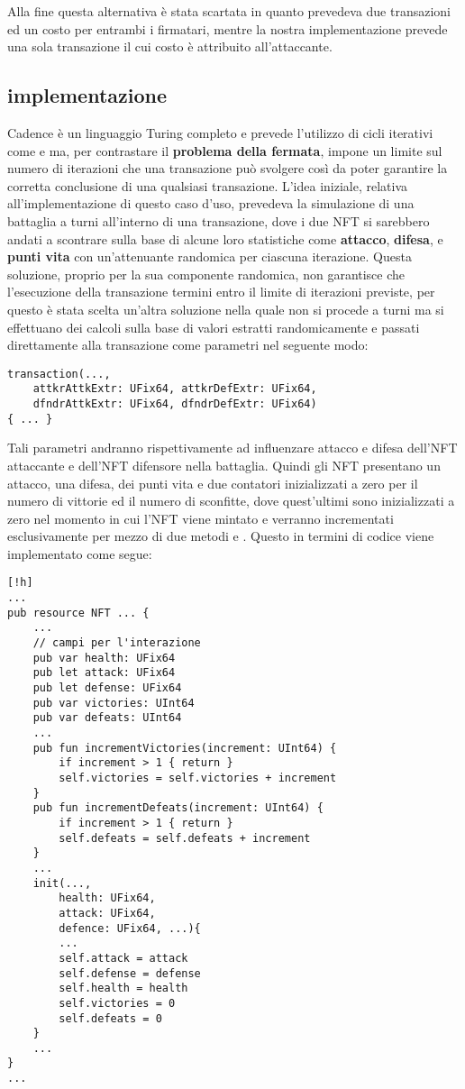 Alla fine questa alternativa è stata scartata in quanto prevedeva due transazioni ed un costo per entrambi i firmatari, mentre la nostra implementazione prevede una sola transazione il cui costo è attribuito all'attaccante.

\subsection{implementazione}
Cadence è un linguaggio Turing completo e prevede l'utilizzo di cicli iterativi come  e  ma, per contrastare il \textbf{problema della fermata}, impone un limite sul numero di iterazioni che una transazione può svolgere così da poter garantire la corretta conclusione di una qualsiasi transazione. L'idea iniziale, relativa all'implementazione di questo caso d'uso, prevedeva la simulazione di una battaglia a turni all'interno di una transazione, dove i due NFT si sarebbero andati a scontrare sulla base di alcune loro statistiche come \textbf{attacco}, \textbf{difesa}, e \textbf{punti vita} con un'attenuante randomica per ciascuna iterazione. Questa soluzione, proprio per la sua componente randomica, non garantisce che l'esecuzione della transazione termini entro il limite di iterazioni previste, per questo è stata scelta un'altra soluzione nella quale non si procede a turni ma si effettuano dei calcoli sulla base di valori estratti randomicamente e passati direttamente alla transazione come parametri nel seguente modo:
\begin{lstlisting}[style=all, style=cadence]
transaction(..., 
	attkrAttkExtr: UFix64, attkrDefExtr: UFix64, 
    dfndrAttkExtr: UFix64, dfndrDefExtr: UFix64)
{ ... }
\end{lstlisting}
Tali parametri andranno rispettivamente ad influenzare attacco e difesa dell'NFT attaccante e dell'NFT difensore nella battaglia. Quindi gli NFT presentano un attacco, una difesa, dei punti vita e due contatori inizializzati a zero per il numero di vittorie ed il numero di sconfitte, dove quest'ultimi sono inizializzati a zero nel momento in cui l'NFT viene mintato e verranno incrementati esclusivamente per mezzo di due metodi  e . Questo in termini di codice viene implementato come segue:
\begin{lstlisting}[style=all, style=cadence][!h]
...
pub resource NFT ... {
	...
    // campi per l'interazione
    pub var health: UFix64
    pub let attack: UFix64
    pub let defense: UFix64
    pub var victories: UInt64 
    pub var defeats: UInt64
    ...
    pub fun incrementVictories(increment: UInt64) {
        if increment > 1 { return }
        self.victories = self.victories + increment
    }
    pub fun incrementDefeats(increment: UInt64) {
        if increment > 1 { return }
        self.defeats = self.defeats + increment
    }
	...
	init(...,
		health: UFix64,
       	attack: UFix64,
        defence: UFix64, ...){
		...
		self.attack = attack
        self.defense = defense
        self.health = health
        self.victories = 0
        self.defeats = 0
	}
	...
}
...
\end{lstlisting}
